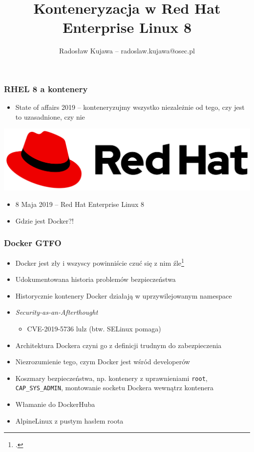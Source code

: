 \documentclass[dvipsnames,table]{beamer}
\title{Konteneryzacja w Red Hat Enterprise Linux 8}
\author{Radosław Kujawa -- radoslaw.kujawa@osec.pl}
\institute{OSEC}
\begin{document}
\begin{frame}
	\titlepage
\end{frame}

\begin{frame}
\frametitle{RHEL 8 a kontenery}
	\begin{itemize}
		\item State of affairs 2019 -- konteneryzujmy wszystko niezależnie od tego, czy jest to uzasadnione, czy nie
	\end{itemize}
	\begin{center}
		\includegraphics[scale=0.1]{img-rhlogo.png}
	\end{center}
	\begin{itemize}
		\item 8 Maja 2019 -- Red Hat Enterprise Linux 8
		\item Gdzie jest Docker?!
	\end{itemize}
\end{frame}

\begin{frame}
	\frametitle{Docker GTFO}
	\begin{itemize}
		\item Docker jest zły i wszyscy powinniście czuć się z nim źle\footcite{Barcamp2016}
		\item Udokumentowana historia problemów bezpieczeństwa
		\item Historycznie kontenery Docker działają w uprzywilejowanym namespace
		\item {\it Security-as-an-Afterthought}
		\begin{itemize}
			\item CVE-2019-5736 lulz (btw. SELinux pomaga)
		\end{itemize}
		\item Architektura Dockera czyni go z definicji trudnym do zabezpieczenia
		\item Niezrozumienie tego, czym Docker jest wśród developerów
		\item Koszmary bezpieczeństwa, np. kontenery z uprawnieniami {\tt root}, {\tt CAP\_SYS\_ADMIN}, montowanie socketu Dockera wewnątrz kontenera
		\item Włamanie do DockerHuba
		\item AlpineLinux z pustym hasłem roota
	\end{itemize}
\end{frame}
\end{document}
